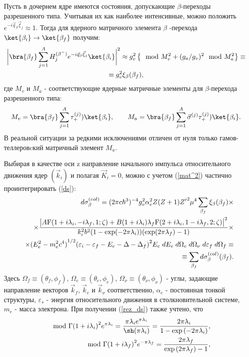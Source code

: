 Пусть в дочернем ядре имеются состояния,
допускающие $\beta$-переходы разрешенного типа. Учитывая их как
наиболее интенсивные, можно положить $e^{-i\vec q_\beta\vec\xi_{j}}{\approx}1$.
Тогда для ядерного матричного элемента  $\beta$ -перехода
$\ket{\beta_i}\to\ket{\beta_f}$ получим:
\begin{multline}\label{mat_nuc}
\bigg|\bra{\beta_f }  \sum_{j=1}^A H^{(\beta^-)}_{j}
e^{-i\vec q_\beta\vec\xi_{j}}\ket{ \beta_i}\bigg|^2\approx
g^2_v\left\{\mod{M_v}^2+(g_a/g_v)^2\mod{M_a}^2\right\}\equiv\\
\equiv
g^2_v \xi_\beta(\beta_f),
\end{multline}
где  $M_v$ и $M_a$ - соответствующие ядерные матричные элементы
для $\beta$-перехода разрешенного типа:
\begin{eqnarray}
M_v=\bra{\beta_f } \sum_{j=1}^A \tau_+^{(j)}) \ket{ \beta_i},\qquad
M_a=\bra{\beta_f } \sum_{j=1}^A \vec\sigma^{(j)}\tau_+^{(j)}) \ket{ \beta_i}.\nonumber
\end{eqnarray}
В реальной ситуации за редкими исключениями отличен от нуля только
гамов-теллеров\-cкий матричный элемент $M_a$.

Выбирая в качестве оси z направление начального импульса относительного движения
ядер $(\vec k_i )$ и полагая $\vec K_i =0 $,  можно  с учетом (\ref{mat^2})
частично  проинтегрировать (\ref{ds}):
\begin{eqnarray}\label{rez_ds}
&&d\sigma^{(col)}_\beta=
(2 \pi c \hbar^3)^{-4}
g_v^2 \alpha_e^2 Z (Z+1) {Z'}^2 \mu^4
\sum_{\beta_f}\xi_\beta(\beta_f)\times\nonumber\\
&&\times {{\big| A {\rm F} (1+i \lambda_i,-i \lambda_f,1;\zeta) + B (1+i \lambda_i)\lambda_f
{\rm F} (2+i \lambda_i,1-i \lambda_f,2;\zeta)\big|^2}\over{ k_i^2 b^2
(1-\exp(-2\pi\lambda_i))(\exp(2\pi\lambda_f)-1)}}\times\nonumber\\
&&\times {(E_e^2 - m_e^2 c^4)}^{1/2}{(\varepsilon_i - \varepsilon_f - E_e - \Delta
- \Delta_f)}^2  E_e \;dE_e \; d\Omega_e \; d\Omega_{\nu}\;d\varepsilon_f \; d\Omega_f \equiv\nonumber\\
&&\equiv \sum_{\beta_f} d\sigma^{(col)}_\beta (\beta_f).
\end{eqnarray}
Здесь $\Omega_f\equiv (\theta_f,\phi_f)$, $\Omega_e\equiv (\theta_e,\phi_e)$,
$\Omega_\nu\equiv (\theta_\nu,\phi_\nu)$ - углы, задающие направление
векторов ${\vec k}_f$, ${\vec k}_e$ и ${\vec k}_\nu$ соответственно,
$\alpha_e$ - постоянная тонкой
структуры, $\varepsilon_s$ - энергия относительного движения в столкновительной
системе, $m_e$ - масса электрона. При получении (\ref{rez_ds}) также учтено, что
\begin{eqnarray}
&&\mod{\Gamma{(1+i\lambda_i)}}^2 e^{\pi\lambda_i} = {{\pi\lambda_i e^{\pi\lambda_i}}
\over{\sh (\pi\lambda_i)}} = {{2 \pi\lambda_i}\over{1- \exp{(-2\pi\lambda_i)}}},\nonumber\\
&&\mod{\Gamma{(1+i\lambda_f)}}^2 e^{- \pi\lambda_f} = {{2 \pi\lambda_f}\over{\exp{(2 \pi\lambda_f)-1}}},
\end{eqnarray}


